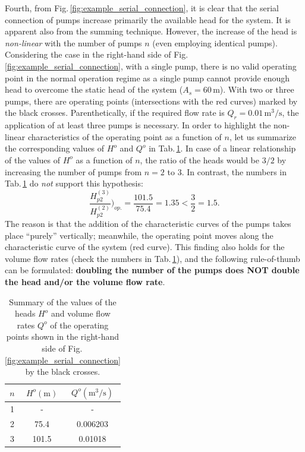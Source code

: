 Fourth, from Fig.\,\ref{fig:example_serial_connection}, it is clear that the serial connection of pumps increase primarily the available head for the system. It is apparent also from the summing technique. However, the increase of the head is \textit{non-linear} with the number of pumps $n$ (even employing identical pumps). Considering the case in the right-hand side of Fig.\,\ref{fig:example_serial_connection}, with a single pump, there is no valid operating point in the normal operation regime as a single pump cannot provide enough head to overcome the static head of the system ($A_s=60\,\mathrm{m}$). With two or three pumps, there are operating points (intersections with the red curves) marked by the black crosses. Parenthetically, if the required flow rate is $Q_r=0.01\,\mathrm{m^3/s}$, the application of at least three pumps is necessary. In order to highlight the non-linear characteristics of the operating point as a function of $n$, let us summarize the corresponding values of $H^o$ and $Q^o$ in Tab.\,\ref{tab:summary_oprating_points_serial_connection}. In case of a linear relationship of the values of $H^o$ as a function of $n$, the ratio of the heads would be $3/2$ by increasing the number of pumps from $n=2$ to $3$. In contrast, the numbers in Tab.\,\ref{tab:summary_oprating_points_serial_connection} do \textit{not} support this hypothesis:
%
\begin{equation}
\frac{ H_{p2}^{(3)} }{ H_{p2}^{(2)} } \Bigg)_{op.} = \frac{101.5}{75.4} = 1.35 < \frac{3}{2} = 1.5.
\end{equation}
%
The reason is that the addition of the characteristic curves of the pumps takes place ``purely'' vertically; meanwhile, the operating point moves along the characteristic curve of the system (red curve). This finding also holds for the volume flow rates (check the numbers in Tab.\,\ref{tab:summary_oprating_points_serial_connection}), and the following rule-of-thumb can be formulated: \textbf{doubling the number of the pumps does NOT double the head and/or the volume flow rate}.

\begin{table}[ht!]
\caption{Summary of the values of the heads $H^o$ and volume flow rates $Q^o$ of the operating points shown in the right-hand side of Fig.\,\ref{fig:example_serial_connection} by the black crosses.}
	\label{tab:summary_oprating_points_serial_connection}
	\centering
		\begin{tabular}{c|cc}
		 $n$ & $H^o (\mathrm{m})$ & $Q^o (\mathrm{m^3/s})$ \\ \hline \hline
		 1   & -                  & -        \\
		 2   & 75.4               & 0.006203 \\
		 3   & 101.5              & 0.01018  \\
		\end{tabular}
\end{table}

